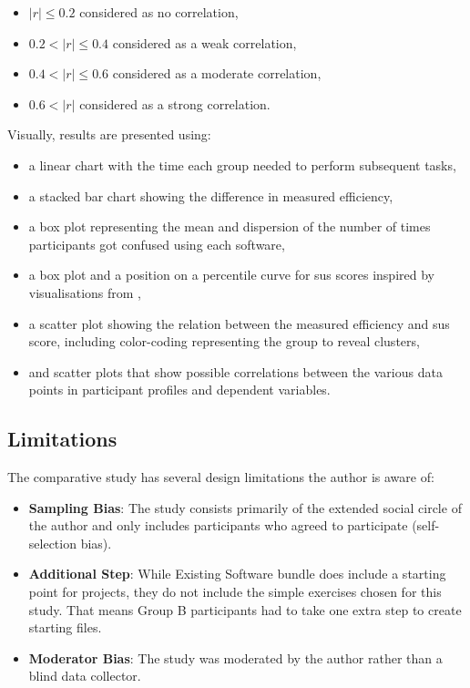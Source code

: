 \begin{itemize}
    \item $|r| \le 0.2$ considered as no correlation,
    \item $0.2 < |r| \le 0.4$ considered as a weak correlation,
    \item $0.4 < |r| \le 0.6$ considered as a moderate correlation,
    \item $0.6 < |r|$ considered as a strong correlation.
\end{itemize}

Visually, results are presented using:

\begin{itemize}
    \item a linear chart with the time each group needed to perform subsequent tasks,
    \item a stacked bar chart showing the difference in measured efficiency,
    \item a box plot representing the mean and dispersion of the number of times participants got confused using each software,
    \item a box plot and a position on a percentile curve for \gls{sus} scores inspired by visualisations from \textcite{Blattgerste_2022},
    \item a scatter plot showing the relation between the measured efficiency and \gls{sus} score, including color-coding representing the group to reveal clusters,
    \item and scatter plots that show possible correlations between the various data points in participant profiles and dependent variables.
\end{itemize}

\subsection{Limitations}

The comparative study has several design limitations the author is aware of:

\begin{itemize}
    \item \textbf{Sampling Bias}: The study consists primarily of the extended social circle of the author and only includes participants who agreed to participate (self-selection bias).
    \item \textbf{Additional Step}: While Existing Software bundle does include a starting point for projects, they do not include the simple exercises chosen for this study. That means Group B participants had to take one extra step to create starting files.
    \item \textbf{Moderator Bias}: The study was moderated by the author rather than a blind data collector.
\end{itemize}
